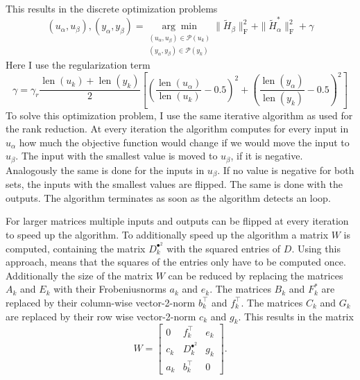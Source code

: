 \documentclass[doctype=mastersthesis,BCOR=15mm,biblatex]{ldvbook}%
\DeclareMathOperator{\length}{len}
\newcommand{\partition}{\mathcal{P}}
\begin{document}
This results in the discrete optimization problems
\begin{equation}
	(u_\alpha,u_\beta),(y_\alpha,y_\beta) = \underset{\substack{(u_\alpha, u_\beta) \in \partition(u_k)\\(y_\alpha, y_\beta) \in \partition(y_k)
		}}{\arg\min} \|\tilde{H}_\beta\|_\text{F}^2 + \|\tilde{H}_\alpha^*\|_\text{F}^2 +\gamma
\end{equation}
Here I use the regularization term
\begin{equation}
	\gamma =\gamma_r \frac{\length(u_k)+\length(y_k)}{2}%
	\left[ \left(\frac{\length(u_\alpha)}{\length(u_k)}-0.5\right)^2
	+
	\left(\frac{\length(y_\alpha)}{\length(y_k)}-0.5\right)^2
	\right]
\end{equation}
To solve this optimization problem, I use the same iterative algorithm as used for the rank reduction.
At every iteration the algorithm computes for every input in $u_\alpha$ how much the objective function would change if we would move the input to $u_\beta$.
The input with the smallest value is moved to $u_\beta$, if it is negative.
Analogously the same is done for the inputs in $u_\beta$.
If no value is negative for both sets, the inputs with the smallest values are flipped.
The same is done with the outputs.
The algorithm terminates as soon as the algorithm detects an loop.


For larger matrices multiple inputs and outputs can be flipped at every iteration to speed up the algorithm.
To additionally speed up the algorithm a matrix $W$ is computed, containing the matrix $D_k^{\bullet^2}$ with the squared entries of $D$.
Using this approach, means that the squares of the entries only have to be computed once.
Additionally the size of the matrix $W$ can be reduced by replacing the matrices $A_k$ and $E_k$ with their Frobeniusnorms $a_k$ and $e_k$.
The matrices $B_k$ and $F_k^*$ are replaced by their column-wise vector-2-norm $b_k^\top$ and $f_k^\top$.
The matrices $C_k$ and $G_k$ are replaced by their row wise vector-2-norm $c_k$ and $g_k$.
This results in the matrix
\begin{equation}
	W = 
	\begin{bmatrix}
	0   &f_k^\top & e_k\\
	c_k & D_k^{\bullet^2} & g_k\\
	a_k & b_k^\top & 0
	\end{bmatrix}
	.
\end{equation}
\end{document}
